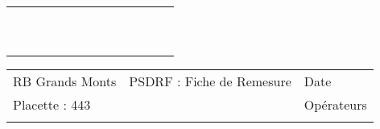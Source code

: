 \documentclass[a4paper, landscape]{article}\usepackage[]{graphicx}\usepackage[]{color}
\begin{document}
{\begin{tabular}{|p{1cm}|p{2cm}|p{1.6cm}|p{1.6cm}|p{1.6cm}|p{1.6cm}|p{1.5cm}|p{1.5cm}|p{1.5cm}|p{1.5cm}|p{1.5cm}|p{7.5cm}|p{5cm}|}
 &  &  &  &  &  &  &  &  &  &  &  &  \\ 
   \hline
 &  &  &  &  &  &  &  &  &  &  &  &  \\ 
   \rowcolor[gray]{0.95} \hline
 &  &  &  &  &  &  &  &  &  &  &  &  \\ 
   \hline
 &  &  &  &  &  &  &  &  &  &  &  &  \\ 
   \rowcolor[gray]{0.95} \hline
 &  &  &  &  &  &  &  &  &  &  &  &  \\ 
   \hline
 &  &  &  &  &  &  &  &  &  &  &  &  \\ 
   \rowcolor[gray]{0.95} \hline
 &  &  &  &  &  &  &  &  &  &  &  &  \\ 
   \hline
 &  &  &  &  &  &  &  &  &  &  &  &  \\ 
   \rowcolor[gray]{0.95} \hline
 &  &  &  &  &  &  &  &  &  &  &  &  \\ 
   \hline
 &  &  &  &  &  &  &  &  &  &  &  &  \\ 
   \rowcolor[gray]{0.95} \hline
 &  &  &  &  &  &  &  &  &  &  &  &  \\ 
   \hline
\end{tabular}
}

\begin{tabular}{p{10cm}p{10cm}p{8cm}}
  RB Grands Monts & PSDRF : Fiche de Remesure & Date \\ 
  Placette : 443 &  & Opérateurs \\ 
   &  &  \\ 
  \end{tabular}
\end{document}
